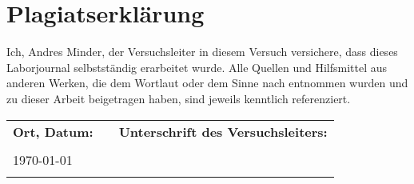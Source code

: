 \chapter{Plagiatserklärung}
\thispagestyle{fancy}
Ich, Andres Minder, der Versuchsleiter in diesem Versuch versichere, dass dieses Laborjournal selbstständig erarbeitet wurde. Alle Quellen und Hilfsmittel aus anderen Werken, die dem Wortlaut oder dem Sinne nach entnommen wurden und zu dieser Arbeit beigetragen haben, sind jeweils kenntlich referenziert.\\
\vfill
\begin{center}
\begin{tabular}{p{5cm}p{1cm}l}
\Large\textbf{Ort, Datum:} & & \Large\textbf{Unterschrift des Versuchsleiters:} \\
\vspace{1cm} & \vspace{1cm} & \vspace{1cm} \\
\centering\huge\today & & \\
\hrulefill & & \hrulefill 
\end{tabular}
\end{center}